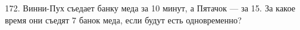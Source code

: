172. Винни-Пух съедает банку меда за 10 минут, а Пятачок --- за 15. За какое время они съедят 7 банок меда, если будут есть одновременно?\\
